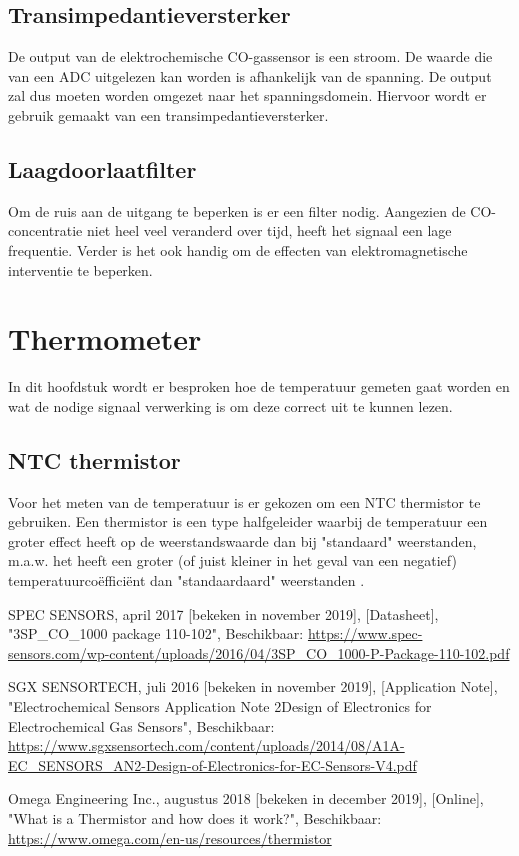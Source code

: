 \documentclass[a4paper, 11pt]{article} %
\begin{document}
	\subsection{Transimpedantieversterker} \label{subsec::transimpedantieversterker}
	De output van de elektrochemische CO-gassensor is een stroom. De waarde die van een ADC uitgelezen kan worden is afhankelijk van de spanning. De output zal dus moeten worden omgezet naar het spanningsdomein. Hiervoor wordt er gebruik gemaakt van een transimpedantieversterker.
	\subsection{Laagdoorlaatfilter} \label{subsec::laagdoorlaatfilter}
	Om de ruis aan de uitgang te beperken is er een filter nodig. Aangezien de CO-concentratie niet heel veel veranderd over tijd, heeft het signaal een lage frequentie. Verder is het ook handig om de effecten van elektromagnetische interventie te beperken.
	
	\section{Thermometer} \label{sec::thermometer}
	In dit hoofdstuk wordt er besproken hoe de temperatuur gemeten gaat worden en wat de nodige signaal verwerking is om deze correct uit te kunnen lezen.
	\subsection{NTC thermistor} \label{subsec::NTC_thermistor}
	Voor het meten van de temperatuur is er gekozen om een NTC thermistor te gebruiken. Een thermistor is een type halfgeleider waarbij de temperatuur een groter effect heeft op de weerstandswaarde dan bij "standaard" weerstanden, m.a.w. het heeft een groter (of juist kleiner in het geval van een negatief) temperatuurcoëfficiënt dan "standaardaard" weerstanden \cite{thermistor}.
	\newpage
	
	\begin{thebibliography}{9}
		SPEC SENSORS,
		april 2017 [bekeken in november 2019],
		[Datasheet],
		"3SP\_CO\_1000 package 110-102",
		Beschikbaar:
		\url{https://www.spec-sensors.com/wp-content/uploads/2016/04/3SP_CO_1000-P-Package-110-102.pdf}
		
		SGX SENSORTECH,
		juli 2016 [bekeken in november 2019],
		[Application Note],
		"Electrochemical Sensors Application Note 2Design of Electronics for Electrochemical Gas Sensors",
		Beschikbaar:
		\url{https://www.sgxsensortech.com/content/uploads/2014/08/A1A-EC_SENSORS_AN2-Design-of-Electronics-for-EC-Sensors-V4.pdf}
		
		Omega Engineering Inc.,
		augustus 2018 [bekeken in december 2019],
		[Online],
		"What is a Thermistor and how does it work?",
		Beschikbaar:
		\url{https://www.omega.com/en-us/resources/thermistor}

	\end{thebibliography}
\end{document}
